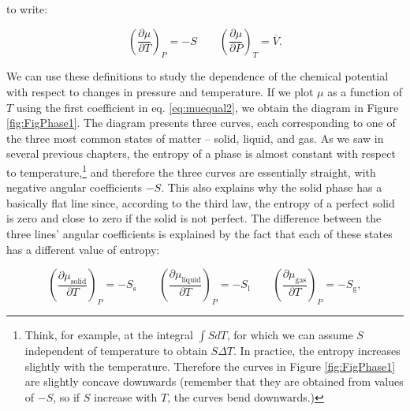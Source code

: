 \documentclass[
  9pt,
]{extbook}
\theoremstyle{definition}
\theoremstyle{definition}
\theoremstyle{definition}
\theoremstyle{definition}
\theoremstyle{remark}
\begin{document}
to write:

\begin{equation}
\left( \frac{\partial \mu}{\partial T} \right)_P=-S \qquad \left( \frac{\partial \mu}{\partial P} \right)_T =\overline{V}.
\label{eq:muequal2}
\end{equation}

We can use these definitions to study the dependence of the chemical potential with respect to changes in pressure and temperature. If we plot \(\mu\) as a function of \(T\) using the first coefficient in eq. \eqref{eq:muequal2}, we obtain the diagram in Figure \ref{fig:FigPhase1}. The diagram presents three curves, each corresponding to one of the three most common states of matter -- solid, liquid, and gas. As we saw in several previous chapters, the entropy of a phase is almost constant with respect to temperature,\footnote{Think, for example, at the integral \(\int SdT\), for which we can assume \(S\) independent of temperature to obtain \(S\Delta T\). In practice, the entropy increases slightly with the temperature. Therefore the curves in Figure \ref{fig:FigPhase1} are slightly concave downwards (remember that they are obtained from values of \(-S\), so if \(S\) increase with \(T\), the curves bend downwards.)} and therefore the three curves are essentially straight, with negative angular coefficients \(-S\). This also explains why the solid phase has a basically flat line since, according to the third law, the entropy of a perfect solid is zero and close to zero if the solid is not perfect. The difference between the three lines' angular coefficients is explained by the fact that each of these states has a different value of entropy:

\begin{equation}
\left( \frac{\partial \mu_{\text{solid}}}{\partial T} \right)_P =-S_{\text{s}} \qquad \left( \frac{\partial \mu_{\text{liquid}}}{\partial T} \right)_P =-S_{\text{l}} \qquad \left( \frac{\partial \mu_{\text{gas}}}{\partial T} \right)_P =-S_{\text{g}},
\label{eq:muequal3}
\end{equation}
\end{document}
